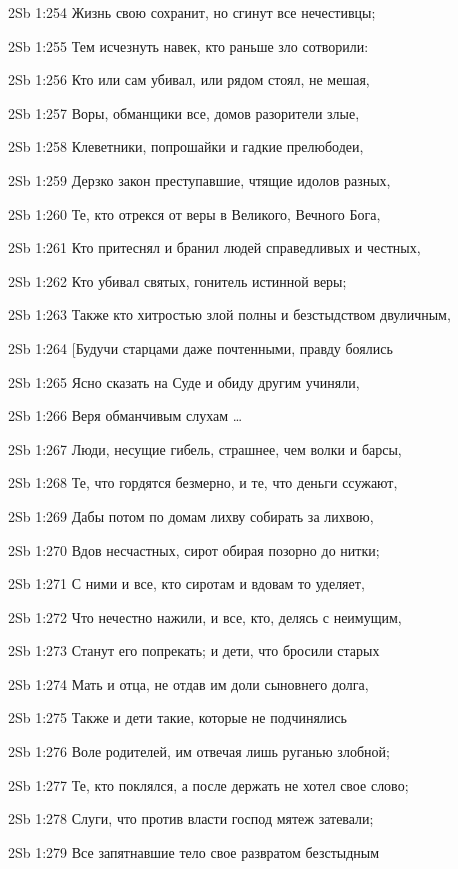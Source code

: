\vs 2Sb 1:254 Жизнь свою сохранит, но сгинут все нечестивцы;

\vs 2Sb 1:255 Тем исчезнуть навек, кто раньше зло сотворили: 

\vs 2Sb 1:256 Кто или сам убивал, или рядом стоял, не мешая, 

\vs 2Sb 1:257 Воры, обманщики все, домов разорители злые, 

\vs 2Sb 1:258 Клеветники, попрошайки и гадкие прелюбодеи, 

\vs 2Sb 1:259 Дерзко закон преступавшие, чтящие идолов разных,

\vs 2Sb 1:260 Те, кто отрекся от веры в Великого, Вечного Бога, 

\vs 2Sb 1:261 Кто притеснял и бранил людей справедливых и честных, 

\vs 2Sb 1:262 Кто убивал святых, гонитель истинной веры; 

\vs 2Sb 1:263 Также кто хитростью злой полны и безстыдством двуличным, 

\vs 2Sb 1:264 [Будучи старцами даже почтенными, правду боялись

\vs 2Sb 1:265 Ясно сказать на Суде и обиду другим учиняли, 

\vs 2Sb 1:266 Веря обманчивым слухам \ldots

\vs 2Sb 1:267 Люди, несущие гибель, страшнее, чем волки и барсы, 

\vs 2Sb 1:268 Те, что гордятся безмерно, и те, что деньги ссужают, 

\vs 2Sb 1:269 Дабы потом по домам лихву собирать за лихвою,

\vs 2Sb 1:270 Вдов несчастных, сирот обирая позорно до нитки; 

\vs 2Sb 1:271 С ними и все, кто сиротам и вдовам то уделяет, 

\vs 2Sb 1:272 Что нечестно нажили, и все, кто, делясь с неимущим, 

\vs 2Sb 1:273 Станут его попрекать; и дети, что бросили старых 

\vs 2Sb 1:274 Мать и отца, не отдав им доли сыновнего долга,

\vs 2Sb 1:275 Также и дети такие, которые не подчинялись

\vs 2Sb 1:276 Воле родителей, им отвечая лишь руганью злобной; 

\vs 2Sb 1:277 Те, кто поклялся, а после держать не хотел свое слово; 

\vs 2Sb 1:278 Слуги, что против власти господ мятеж затевали; 

\vs 2Sb 1:279 Все запятнавшие тело свое развратом безстыдным

